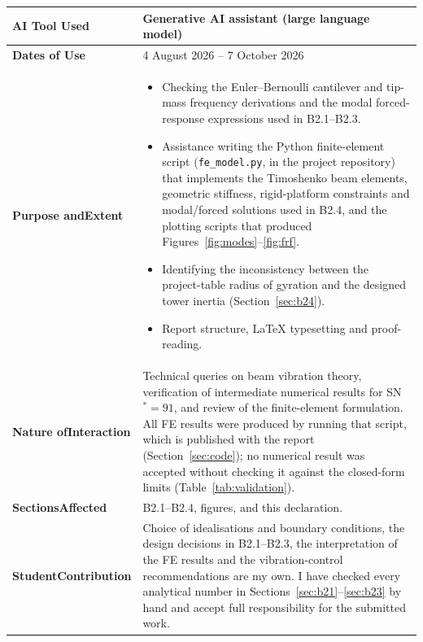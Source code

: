 \documentclass[11pt,a4paper]{article}
\begin{document}
\vspace{3mm}
{\renewcommand{\arraystretch}{1.3}\small
\noindent\begin{tabular}{@{}>{\raggedright\arraybackslash}p{3.1cm}p{12.8cm}@{}}
\toprule
\textbf{AI Tool Used} & Generative AI assistant (large language model) \\
\midrule
\textbf{Dates of Use} & 4 August 2026 -- 7 October 2026 \\
\midrule
\textbf{Purpose and\newline Extent} &
\begin{itemize}[leftmargin=*,nosep,itemsep=2pt]
\item Checking the Euler--Bernoulli cantilever and tip-mass frequency derivations and the modal forced-response expressions used in B2.1--B2.3.
\item Assistance writing the Python finite-element script (\texttt{fe\_model.py}, in the project repository) that implements the Timoshenko beam elements, geometric stiffness, rigid-platform constraints and modal/forced solutions used in B2.4, and the plotting scripts that produced Figures~\ref{fig:modes}--\ref{fig:frf}.
\item Identifying the inconsistency between the project-table radius of gyration and the designed tower inertia (Section~\ref{sec:b24}).
\item Report structure, LaTeX typesetting and proof-reading.
\end{itemize} \\
\midrule
\textbf{Nature of\newline Interaction} &
Technical queries on beam vibration theory, verification of intermediate numerical results for SN$^*=91$, and review of the finite-element formulation. All FE results were produced by running that script, which is published with the report (Section~\ref{sec:code}); no numerical result was accepted without checking it against the closed-form limits (Table~\ref{tab:validation}). \\
\midrule
\textbf{Sections\newline Affected} & B2.1--B2.4, figures, and this declaration. \\
\midrule
\textbf{Student\newline Contribution} &
Choice of idealisations and boundary conditions, the design decisions in B2.1--B2.3, the interpretation of the FE results and the vibration-control recommendations are my own. I have checked every analytical number in Sections~\ref{sec:b21}--\ref{sec:b23} by hand and accept full responsibility for the submitted work. \\
\bottomrule
\end{tabular}}
\vspace{6mm}
\end{document}
